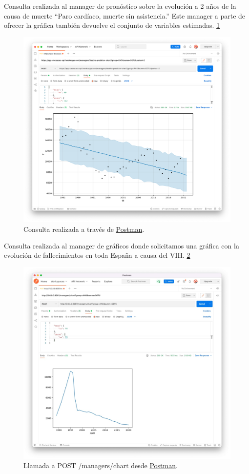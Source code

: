 Consulta realizada al manager de pronóstico sobre la evolución a 2 años de la causa de
muerte ``Paro cardíaco, muerte sin asistencia.''
Este manager a parte de ofrecer la gráfica también devuelve el conjunto de variables
estimadas. \ref{fig:2}
\FloatBarrier
\begin{figure}[h]
	\centering
	\includegraphics[width=\textwidth]{doc/logos/imgs/ejemplo2.png}
	\caption{ Consulta realizada a través de \href{https://www.postman.com/}{Postman}. }
	\label{fig:2}
\end{figure}
\FloatBarrier

Consulta realizada al manager de gráficos donde solicitamos una gráfica con la evolución 
de fallecimientos en toda España a causa del VIH. \ref{fig:3}
\FloatBarrier
\begin{figure}[h]
	\centering	
	\includegraphics[width=\textwidth]{doc/logos/imgs/api-managers.jpg}
	\caption{ Llamada a POST /managers/chart desde
	\href{https://www.postman.com/}{Postman}. }
    \label{fig:3}
\end{figure}
\FloatBarrier

